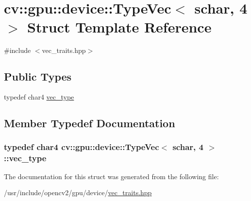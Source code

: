 \hypertarget{structcv_1_1gpu_1_1device_1_1TypeVec_3_01schar_00_014_01_4}{\section{cv\-:\-:gpu\-:\-:device\-:\-:Type\-Vec$<$ schar, 4 $>$ Struct Template Reference}
\label{structcv_1_1gpu_1_1device_1_1TypeVec_3_01schar_00_014_01_4}
}


{\ttfamily \#include $<$vec\-\_\-traits.\-hpp$>$}

\subsection*{Public Types}
\begin{DoxyCompactItemize}
\item 
typedef char4 \hyperlink{structcv_1_1gpu_1_1device_1_1TypeVec_3_01schar_00_014_01_4_ab73ee770ca4757381d75b2ac50ab9e57}{vec\-\_\-type}
\end{DoxyCompactItemize}


\subsection{Member Typedef Documentation}
\hypertarget{structcv_1_1gpu_1_1device_1_1TypeVec_3_01schar_00_014_01_4_ab73ee770ca4757381d75b2ac50ab9e57}{
\subsubsection[{vec\-\_\-type}]{\setlength{\rightskip}{0pt plus 5cm}typedef char4 {\bf cv\-::gpu\-::device\-::\-Type\-Vec}$<$ {\bf schar}, 4 $>$\-::{\bf vec\-\_\-type}}}\label{structcv_1_1gpu_1_1device_1_1TypeVec_3_01schar_00_014_01_4_ab73ee770ca4757381d75b2ac50ab9e57}


The documentation for this struct was generated from the following file\-:\begin{DoxyCompactItemize}
\item 
/usr/include/opencv2/gpu/device/\hyperlink{vec__traits_8hpp}{vec\-\_\-traits.\-hpp}\end{DoxyCompactItemize}
